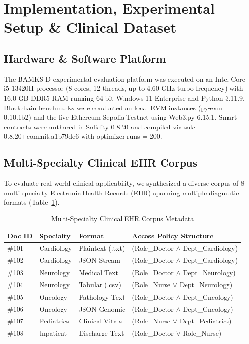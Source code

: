 \documentclass[journal,10pt,twocolumn]{IEEEtran}
\begin{document}
\section{Implementation, Experimental Setup \& Clinical Dataset}

\subsection{Hardware \& Software Platform}
The BAMKS-D experimental evaluation platform was executed on an Intel Core i5-13420H processor (8 cores, 12 threads, up to 4.60 GHz turbo frequency) with 16.0 GB DDR5 RAM running 64-bit Windows 11 Enterprise and Python 3.11.9. Blockchain benchmarks were conducted on local EVM instances (py-evm 0.10.1b2) and the live Ethereum Sepolia Testnet using Web3.py 6.15.1. Smart contracts were authored in Solidity 0.8.20 and compiled via solc 0.8.20+commit.a1b79de6 with optimizer runs = 200.

\subsection{Multi-Specialty Clinical EHR Corpus}
To evaluate real-world clinical applicability, we synthesized a diverse corpus of 8 multi-specialty Electronic Health Records (EHR) spanning multiple diagnostic formats (Table~\ref{tab:ehr_dataset}).

\begin{table}[t]
\caption{Multi-Specialty Clinical EHR Corpus Metadata}
\label{tab:ehr_dataset}
\centering
\begin{tabular}{llll}
\toprule
\textbf{Doc ID} & \textbf{Specialty} & \textbf{Format} & \textbf{Access Policy Structure} \\
\midrule
\#101 & Cardiology & Plaintext (.txt) & (Role\_Doctor $\land$ Dept\_Cardiology) \\
\#102 & Cardiology & JSON Stream & (Role\_Doctor $\land$ Dept\_Cardiology) \\
\#103 & Neurology & Medical Text & (Role\_Doctor $\land$ Dept\_Neurology) \\
\#104 & Neurology & Tabular (.csv) & (Role\_Nurse $\lor$ Dept\_Neurology) \\
\#105 & Oncology & Pathology Text & (Role\_Doctor $\land$ Dept\_Oncology) \\
\#106 & Oncology & JSON Genomic & (Role\_Doctor $\land$ Dept\_Oncology) \\
\#107 & Pediatrics & Clinical Vitals & (Role\_Nurse $\lor$ Dept\_Pediatrics) \\
\#108 & Inpatient & Discharge Text & (Role\_Doctor $\lor$ Role\_Nurse) \\
\bottomrule
\end{tabular}
\end{table}
\end{document}
